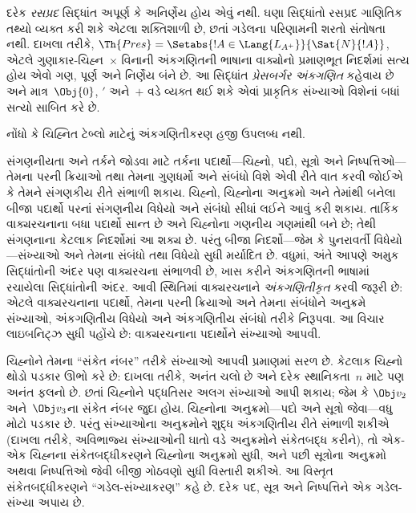 દરેક \emph{રસપ્રદ} સિદ્ધાંત અપૂર્ણ કે
અનિર્ણેય હોય એવું નથી. ઘણા સિદ્ધાંતો
રસપ્રદ ગાણિતિક તથ્યો વ્યક્ત કરી શકે
એટલા શક્તિશાળી છે, છતાં ગડેલના પરિણામની
શરતો સંતોષતા નથી. દાખલા તરીકે,
$\Th{Pres} = \Setabs{!A \in \Lang{L_{A^+}}}{\Sat{N}{!A}}$,
એટલે ગુણાકાર-ચિહ્ન~$\times$ વિનાની
અંકગણિતની ભાષાના વાક્યોનો
પ્રમાણભૂત નિદર્શમાં સત્ય હોય એવો ગણ,
પૂર્ણ અને નિર્ણેય બંને છે. આ સિદ્ધાંત
\emph{પ્રેસબર્ગર અંકગણિત} કહેવાય છે અને
માત્ર~$\Obj{0}$, $\prime$ અને~$+$ વડે
વ્યક્ત થઈ શકે એવાં પ્રાકૃતિક સંખ્યાઓ
વિશેનાં બધાં સત્યો સાબિત કરે છે.
\endgroup


\OLEndChapterHook
\endgroup


\begingroup
\makeatletter{}\makeatother

\label{guunit:OLP-0280}


\begin{editorial}
  નોંધો કે ચિહ્નિત ટેબ્લો માટેનું અંકગણિતીકરણ હજી ઉપલબ્ધ નથી.
\end{editorial}

\begingroup
\makeatletter{}\makeatother

\label{guunit:OLP-0281}


સંગણનીયતા અને તર્કને જોડવા માટે તર્કના
પદાર્થો—ચિહ્નો, પદો, સૂત્રો અને
નિષ્પત્તિઓ—તેમના પરની ક્રિયાઓ તથા
તેમના ગુણધર્મો અને સંબંધો વિશે એવી રીતે
વાત કરવી જોઈએ કે તેમને સંગણકીય રીતે
સંભાળી શકાય. ચિહ્નો, ચિહ્નોના અનુક્રમો
અને તેમાંથી બનેલા બીજા પદાર્થો પરનાં
સંગણનીય વિધેયો અને સંબંધો સીધાં લઈને
આવું કરી શકાય. તાર્કિક વાક્યરચનાના
બધા પદાર્થો સાન્ત છે અને ચિહ્નોના
ગણનીય ગણમાંથી બને છે; તેથી
સંગણનાના કેટલાક નિદર્શોમાં આ શક્ય છે.
પરંતુ બીજા નિદર્શો—જેમ કે પુનરાવર્તી
વિધેયો—સંખ્યાઓ અને તેમના સંબંધો તથા
વિધેયો સુધી મર્યાદિત છે. વધુમાં, અંતે
આપણે અમુક સિદ્ધાંતોની અંદર પણ વાક્યરચના
સંભાળવી છે, ખાસ કરીને અંકગણિતની ભાષામાં
રચાયેલા સિદ્ધાંતોની અંદર. આવી સ્થિતિમાં
વાક્યરચનાને \emph{અંકગણિતીકૃત} કરવી
જરૂરી છે: એટલે વાક્યરચનાના પદાર્થો,
તેમના પરની ક્રિયાઓ અને તેમના સંબંધોને
અનુક્રમે સંખ્યાઓ, અંકગણિતીય વિધેયો અને
અંકગણિતીય સંબંધો તરીકે નિરૂપવા. આ
વિચાર લાઇબનિટ્ઝ સુધી પહોંચે છે: વાક્યરચનાના
પદાર્થોને સંખ્યાઓ આપવી.

ચિહ્નોને તેમના ``સંકેત નંબર'' તરીકે સંખ્યાઓ
આપવી પ્રમાણમાં સરળ છે. કેટલાક ચિહ્નો
થોડો પડકાર ઊભો કરે છે: દાખલા તરીકે,
અનંત ચલો છે અને દરેક
સ્થાનિકતા~$n$ માટે પણ અનંત
ફલનો છે. છતાં ચિહ્નોને પદ્ધતિસર
અલગ સંખ્યાઓ આપી શકાય; જેમ કે
$\Obj v_2$ અને~$\Obj v_3$ના સંકેત
નંબર જુદા હોય. ચિહ્નોના અનુક્રમો—પદો
અને સૂત્રો જેવા—વધુ મોટો પડકાર
છે. પરંતુ સંખ્યાઓના અનુક્રમોને શુદ્ધ
અંકગણિતીય રીતે સંભાળી શકીએ (દાખલા તરીકે,
અવિભાજ્ય સંખ્યાઓની ઘાતો વડે અનુક્રમોને
સંકેતબદ્ધ કરીને), તો એક-એક ચિહ્નના
સંકેતબદ્ધીકરણને ચિહ્નોના અનુક્રમો સુધી,
અને પછી સૂત્રોના અનુક્રમો અથવા
નિષ્પત્તિઓ જેવી બીજી ગોઠવણો સુધી
વિસ્તારી શકીએ. આ વિસ્તૃત સંકેતબદ્ધીકરણને
``ગડેલ-સંખ્યાકરણ'' કહે છે. દરેક પદ,
સૂત્ર અને નિષ્પત્તિને એક
ગડેલ-સંખ્યા અપાય છે.

